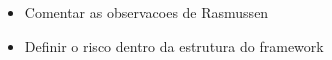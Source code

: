 \cite{riskoldschool}
\cite{safety}

\begin{itemize}
    \item Comentar as observacoes de Rasmussen
    \item Definir o risco dentro da estrutura do framework \cite{safety} 
\end{itemize}
